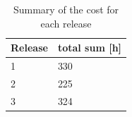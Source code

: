 \documentclass[10pt,a4paper]{article}
\begin{document}
\begin{table}[h!]
\centering
\label{table:SumRelease}
\begin{tabular}{| l | l |} \hline
\textbf{Release} & \textbf{total sum [h]} \\ \hline

1 &  330 \\ \hline
2 & 225 \\ \hline
3 & 324 \\ \hline
\end{tabular}\\
\caption{Summary of the cost for each release}
\end{table}
\end{document}
